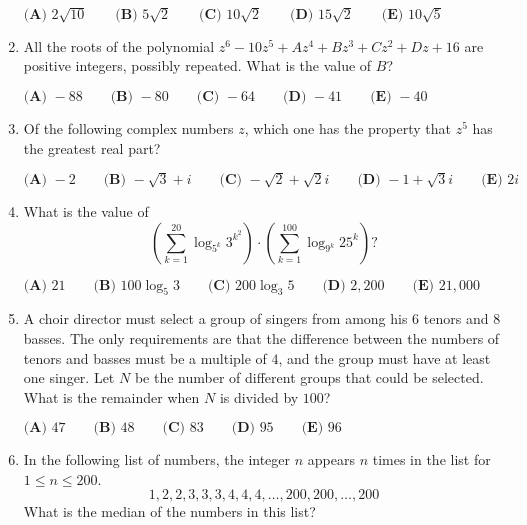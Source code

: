 \documentclass{article}
\begin{document}
\begin{enumerate}[label=\arabic*., itemsep=0.5em]
\(\textbf{(A) }2\sqrt{10} \qquad \textbf{(B) }5\sqrt2 \qquad \textbf{(C) }10\sqrt2 \qquad \textbf{(D) }15\sqrt2 \qquad \textbf{(E) }10\sqrt5\)\par \vspace{0.5em}\item All the roots of the polynomial \(z^6-10z^5+Az^4+Bz^3+Cz^2+Dz+16\) are positive integers, possibly repeated. What is the value of \(B\)?

\(\textbf{(A) }{-}88 \qquad \textbf{(B) }{-}80 \qquad \textbf{(C) }{-}64 \qquad \textbf{(D) }{-}41\qquad \textbf{(E) }{-}40\)\par \vspace{0.5em}\item Of the following complex numbers \(z\), which one has the property that \(z^5\) has the greatest real part?

\(\textbf{(A) }{-}2 \qquad \textbf{(B) }{-}\sqrt3+i \qquad \textbf{(C) }{-}\sqrt2+\sqrt2 i \qquad \textbf{(D) }{-}1+\sqrt3 i\qquad \textbf{(E) }2i\)\par \vspace{0.5em}\item What is the value of
\begin{equation*}
\left(\sum_{k=1}^{20} \log_{5^k} 3^{k^2}\right)\cdot\left(\sum_{k=1}^{100} \log_{9^k} 25^k\right)?
\end{equation*}

\(\textbf{(A) }21 \qquad \textbf{(B) }100\log_5 3 \qquad \textbf{(C) }200\log_3 5 \qquad \textbf{(D) }2{,}200\qquad \textbf{(E) }21{,}000\)\par \vspace{0.5em}\item A choir director must select a group of singers from among his \(6\) tenors and \(8\) basses. The only
requirements are that the difference between the numbers of tenors and basses must be a multiple
of \(4\), and the group must have at least one singer. Let \(N\) be the number of different groups that could be
selected. What is the remainder when \(N\) is divided by \(100\)?

\(\textbf{(A) } 47\qquad\textbf{(B) } 48\qquad\textbf{(C) } 83\qquad\textbf{(D) } 95\qquad\textbf{(E) } 96\qquad\)\par \vspace{0.5em}\item In the following list of numbers, the integer \(n\) appears \(n\) times in the list for \(1\le n \le 200\).
\begin{equation*}
1,2,2,3,3,3,4,4,4,\ldots,200,200,\ldots,200
\end{equation*}
What is the median of the numbers in this list?


\end{enumerate}
\end{document}
